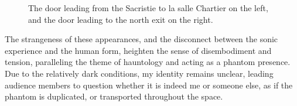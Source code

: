 \documentclass[12pt,twoside,maitrise]{dms_ks}
\theoremstyle{definition}
\begin{document}
{\begin{figure}[h]
    \centering
    \caption{The door leading from the Sacristie to la salle Chartier on the left, and the door leading to the north exit on the right.}
    \label{fig:chartier}
\end{figure}

The strangeness of these appearances, and the disconnect between the sonic experience and the human form, heighten the sense of disembodiment and tension, paralleling the theme of hauntology and acting as a phantom presence. 
Due to the relatively dark conditions, my identity remains unclear, leading audience members to question whether it is indeed me or someone else, as if the phantom is duplicated, or transported throughout the space.

}
\end{document}
